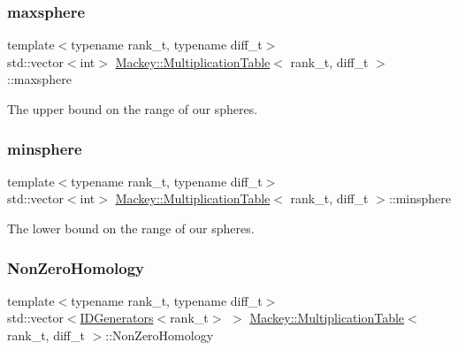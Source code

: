 \subsubsection{\texorpdfstring{maxsphere}{maxsphere}}
{\footnotesize\ttfamily template$<$typename rank\+\_\+t, typename diff\+\_\+t$>$ \\
std\+::vector$<$int$>$ \hyperlink{classMackey_1_1MultiplicationTable}{Mackey\+::\+Multiplication\+Table}$<$ rank\+\_\+t, diff\+\_\+t $>$\+::maxsphere\hspace{0.3cm}{\ttfamily [protected]}}



The upper bound on the range of our spheres. 

\mbox{\label{classMackey_1_1MultiplicationTable_a071f7d7c6cd1c75836b64ea8e9923b49}} 
\subsubsection{\texorpdfstring{minsphere}{minsphere}}
{\footnotesize\ttfamily template$<$typename rank\+\_\+t, typename diff\+\_\+t$>$ \\
std\+::vector$<$int$>$ \hyperlink{classMackey_1_1MultiplicationTable}{Mackey\+::\+Multiplication\+Table}$<$ rank\+\_\+t, diff\+\_\+t $>$\+::minsphere\hspace{0.3cm}{\ttfamily [protected]}}



The lower bound on the range of our spheres. 

\mbox{\label{classMackey_1_1MultiplicationTable_ad392b9570c511595a08642f5d54d20eb}} 
\subsubsection{\texorpdfstring{Non\+Zero\+Homology}{NonZeroHomology}}
{\footnotesize\ttfamily template$<$typename rank\+\_\+t, typename diff\+\_\+t$>$ \\
std\+::vector$<$\hyperlink{classMackey_1_1IDGenerators}{I\+D\+Generators}$<$rank\+\_\+t$>$ $>$ \hyperlink{classMackey_1_1MultiplicationTable}{Mackey\+::\+Multiplication\+Table}$<$ rank\+\_\+t, diff\+\_\+t $>$\+::Non\+Zero\+Homology\hspace{0.3cm}{\ttfamily [protected]}}



